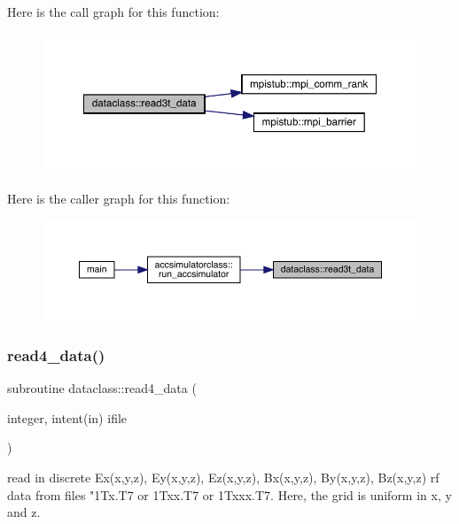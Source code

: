 Here is the call graph for this function\+:\nopagebreak
\begin{figure}[H]
\begin{center}
\leavevmode
\includegraphics[width=350pt]{namespacedataclass_a44430d1d47a985d35f3544c9b7dac562_cgraph}
\end{center}
\end{figure}
Here is the caller graph for this function\+:\nopagebreak
\begin{figure}[H]
\begin{center}
\leavevmode
\includegraphics[width=350pt]{namespacedataclass_a44430d1d47a985d35f3544c9b7dac562_icgraph}
\end{center}
\end{figure}
\mbox{\label{namespacedataclass_a2ef1f00ff4295094270a70c5d3763019}} 
\subsubsection{\texorpdfstring{read4\_data()}{read4\_data()}}
{\footnotesize\ttfamily subroutine dataclass\+::read4\+\_\+data (\begin{DoxyParamCaption}\item[{integer, intent(in)}]{ifile }\end{DoxyParamCaption})}



read in discrete Ex(x,y,z), Ey(x,y,z), Ez(x,y,z), Bx(x,y,z), By(x,y,z), Bz(x,y,z) rf data from files "1\+Tx.\+T7 or 1\+Txx.\+T7 or 1\+Txxx.\+T7. Here, the grid is uniform in x, y and z. 

